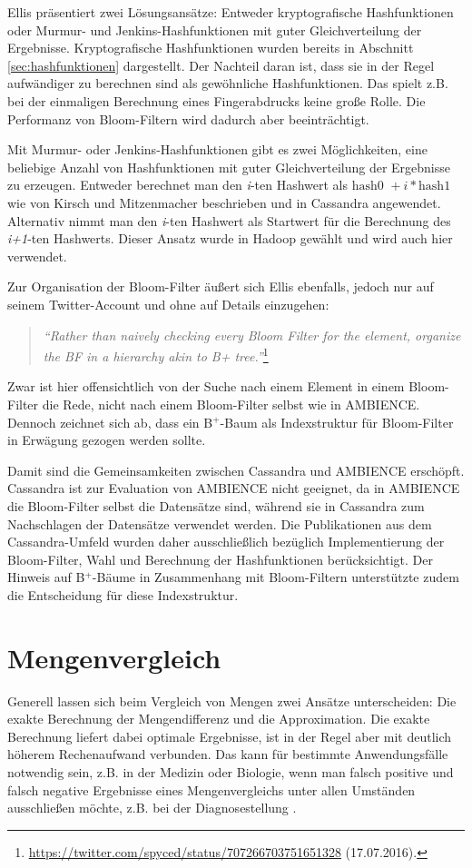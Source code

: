 Ellis präsentiert zwei Lösungsansätze: Entweder kryptografische Hashfunktionen oder Murmur- und Jenkins-Hashfunktionen mit guter Gleichverteilung der Ergebnisse. Kryptografische Hashfunktionen wurden bereits in Abschnitt \ref{sec:hashfunktionen} dargestellt. Der Nachteil daran ist, dass sie in der Regel aufwändiger zu berechnen sind als gewöhnliche Hashfunktionen. Das spielt z.B. bei der einmaligen Berechnung eines Fingerabdrucks keine große Rolle. Die Performanz von Bloom-Filtern wird dadurch aber beeinträchtigt. 

Mit Murmur- oder Jenkins-Hashfunktionen gibt es zwei Möglichkeiten, eine beliebige Anzahl von Hashfunktionen mit guter Gleichverteilung der Ergebnisse zu erzeugen. Entweder berechnet man den \textit{i}-ten Hashwert als $\text{hash0 }+ i\ast \text{hash1}$ wie von Kirsch und Mitzenmacher beschrieben und in Cassandra angewendet. Alternativ nimmt man den \textit{i}-ten Hashwert als Startwert für die Berechnung des \textit{i+1}-ten Hashwerts. Dieser Ansatz wurde in Hadoop gewählt und wird auch hier verwendet. 

Zur Organisation der Bloom-Filter äußert sich Ellis ebenfalls, jedoch nur auf seinem Twitter-Account und ohne auf Details einzugehen: 
\begin{quote}
\textit{"`Rather than naively checking every Bloom Filter for the element, organize the BF in a hierarchy akin to B+ tree."'}\footnote{\url{https://twitter.com/spyced/status/707266703751651328} (17.07.2016).}
\end{quote}
Zwar ist hier offensichtlich von der Suche nach einem Element in einem Bloom-Filter die Rede, nicht nach einem Bloom-Filter selbst wie in AMBIENCE. Dennoch zeichnet sich ab, dass ein B$^+$-Baum als Indexstruktur für Bloom-Filter in Erwägung gezogen werden sollte. 

Damit sind die Gemeinsamkeiten zwischen Cassandra und AMBIENCE erschöpft. Cassandra ist zur Evaluation von AMBIENCE nicht geeignet, da in AMBIENCE die Bloom-Filter selbst die Datensätze sind, während sie in Cassandra zum Nachschlagen der Datensätze verwendet werden. Die Publikationen aus dem Cassandra-Umfeld wurden daher ausschließlich bezüglich Implementierung der Bloom-Filter, Wahl und Berechnung der Hashfunktionen berücksichtigt. Der Hinweis auf B$^+$-Bäume in Zusammenhang mit Bloom-Filtern unterstützte zudem die Entscheidung für diese Indexstruktur. 
\section{Mengenvergleich}\label{sec:mengenvergleich}
Generell lassen sich beim Vergleich von Mengen zwei Ansätze unterscheiden: Die exakte Berechnung der Mengendifferenz und die Approximation. Die exakte Berechnung liefert dabei optimale Ergebnisse, ist in der Regel aber mit deutlich höherem Rechenaufwand verbunden. Das kann für bestimmte Anwendungsfälle notwendig sein, z.B. in der Medizin oder Biologie, wenn man falsch positive und falsch negative Ergebnisse eines Mengenvergleichs unter allen Umständen ausschließen möchte, z.B. bei der Diagnosestellung \cite{Schnell2013}. 

